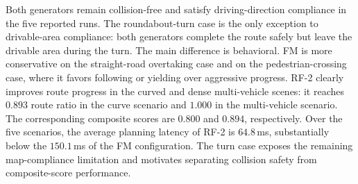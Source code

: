 Both generators remain collision-free and satisfy driving-direction
compliance in the five reported runs.  The roundabout-turn case is
the only exception to drivable-area compliance: both generators
complete the route safely but leave the drivable area during the
turn.  The main
difference is behavioral.  FM is more conservative on the straight-road
overtaking case and on the pedestrian-crossing case, where it favors
following or yielding over aggressive progress.  RF-2 clearly improves
route progress in the curved and dense multi-vehicle scenes: it reaches
\(0.893\) route ratio in the curve scenario and \(1.000\) in the
multi-vehicle scenario.  The corresponding composite scores are
\(0.800\) and \(0.894\), respectively.  Over the five scenarios, the
average planning latency of RF-2 is \(64.8\)\,ms, substantially below
the \(150.1\)\,ms of the FM configuration.  The turn case exposes the
remaining map-compliance limitation and motivates separating
collision safety from composite-score performance.

